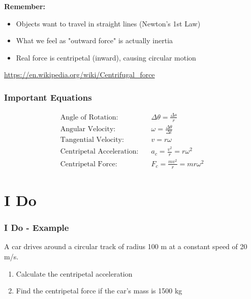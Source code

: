 \documentclass{beamer}
\begin{document}
\begin{frame}
    \textbf{Remember:}
\begin{itemize}
    \item Objects want to travel in straight lines (Newton's 1st Law)
    \item What we feel as "outward force" is actually inertia
    \item Real force is centripetal (inward), causing circular motion
\end{itemize}

\url{https://en.wikipedia.org/wiki/Centrifugal_force}

\end{frame}

\begin{frame}
\frametitle{Important Equations}
\begin{align*}
\text{Angle of Rotation:} & \quad \Delta \theta = \frac{\Delta s}{r} \\[1em]
\text{Angular Velocity:} & \quad \omega = \frac{\Delta \theta}{\Delta t} \\[1em]
\text{Tangential Velocity:} & \quad v = r\omega \\[1em]
\text{Centripetal Acceleration:} & \quad a_c = \frac{v^2}{r} = r\omega^2 \\[1em]
\text{Centripetal Force:} & \quad F_c = \frac{mv^2}{r} = mr\omega^2
\end{align*}
\end{frame}

\section{I Do}

\begin{frame}
\frametitle{I Do - Example}
A car drives around a circular track of radius 100 m at a constant speed of 20 m/s.
\begin{enumerate}
    \item Calculate the centripetal acceleration
    \item Find the centripetal force if the car's mass is 1500 kg
\end{enumerate}

\end{frame}
\end{document}
